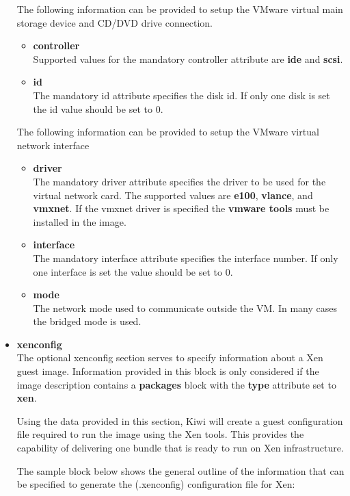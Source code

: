 \begin{itemize}
	The following information can be provided to setup the VMware virtual
	main storage device and CD/DVD drive connection.

	\begin{itemize}
	\item \textbf{controller}\\
      Supported values for the mandatory controller attribute are \textbf{ide}
      and \textbf{scsi}.
	\item \textbf{id}\\
      The mandatory id attribute specifies the disk id. If only one
      disk is set the id value should be set to 0. 
	\end{itemize}

	The following information can be provided to setup the VMware virtual
	network interface

	\begin{itemize}
	\item \textbf{driver}\\
      The mandatory driver attribute specifies the driver to be used for
      the virtual network card. The supported values are \textbf{e100},
      \textbf{vlance}, and \textbf{vmxnet}. If the vmxnet driver is
      specified the \textbf{vmware tools} must be installed in the image.
	\item \textbf{interface}\\
      The mandatory interface attribute specifies the interface number. If
      only one interface is set the value should be set to 0.
	\item \textbf{mode}\\
      The network mode used to communicate outside the VM. In many cases
      the bridged mode is used.
	\end{itemize}

\item \textbf{xenconfig}\\
    The optional xenconfig section serves to specify information
    about a Xen guest image. Information provided in this block is only
    considered if the image description contains a \textbf{packages} block
    with the \textbf{type} attribute set to \textbf{xen}.

    Using the data provided in this section, Kiwi will create a guest
    configuration file required to run the image using the Xen tools.
    This provides the capability of delivering one bundle that is ready
    to run on Xen infrastructure.

    The sample block below shows the general outline of the information
    that can be specified to generate the (.xenconfig) configuration file for
    Xen:


\end{itemize}
